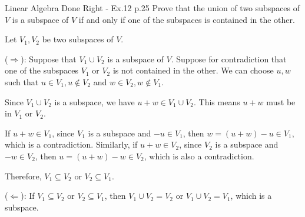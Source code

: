 \begin{problem}{}{}{Linear Algebra Done Right - Ex.12 p.25}
Prove that the union of two subspaces of $V$ is a subspace of $V$
if and only if one of the subspaces is contained in the other.
\end{problem}

\begin{solution}
    Let $V_1, V_2$ be two subspaces of $V$.

    ($\Rightarrow$): Suppose that $V_1 \cup V_2$ is a subspace of $V$.
    Suppose for contradiction that one of the subspaces $V_1$ or $V_2$
    is not contained in the other.
    We can choose $u, w$ such that $u \in V_1, u \notin V_2$
    and $w \in V_2, w \notin V_1$.

    Since $V_1 \cup V_2$ is a subspace, we have $u + w \in V_1 \cup V_2$.
    This means $u + w$ must be in $V_1$ or $V_2$.

    If $u + w \in V_1$, since $V_1$ is a subspace and $-u \in V_1$,
    then $w = (u+w)-u \in V_1$, which is a contradiction.
    Similarly, if $u + w \in V_2$, since $V_2$ is a subspace and $-w \in V_2$,
    then $u = (u+w)-w \in V_2$, which is also a contradiction.

    Therefore, $V_1 \subseteq V_2$ or $V_2 \subseteq V_1$.

    ($\Leftarrow$): If $V_1 \subseteq V_2$ or $V_2 \subseteq V_1$,
    then $V_1 \cup V_2 = V_2$ or $V_1 \cup V_2 = V_1$,
    which is a subspace.

\end{solution}